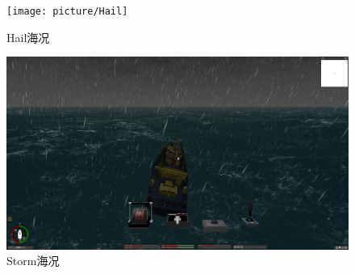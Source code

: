 \documentclass[letterpaper,10pt]{article}
\begin{document}
		\begin{figure}[htbp]
			\centering				\texttt{[image: picture/Hail]}
			\caption{
				\label{fig: Hail1} 
				Hail海况
			}	
		\end{figure}
		
		\begin{figure}[htbp]
			\centering				\includegraphics[width=\columnwidth]{picture/Storm}
			\caption{
				\label{fig: Storm1} 
				Storm海况
			}	
		\end{figure}

	
	
\end{document}
